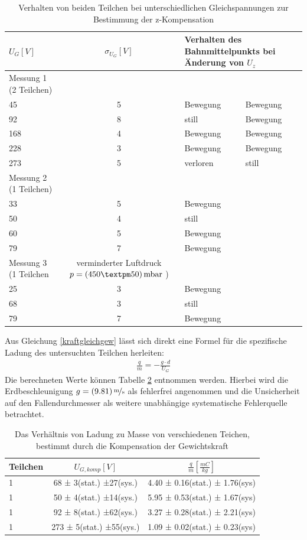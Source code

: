 \documentclass[a4paper,12pt]{article}
\begin{document}
\begin{table}
	\centering
	\begin{tabular}{ l | c | l | l }
		$U_{G} [V]$ & $\sigma_{U_{G}}[V]$ & \multicolumn{2}{l}{Verhalten des Bahnmittelpunkts bei Änderung von $U_z$}  \\
		\hline
		\hline
		Messung 1 (2 Teilchen)\\
		45 & 5 & Bewegung &  Bewegung   \\
		92 & 8 & still  & Bewegung \\
		168 & 4 & Bewegung & Bewegung    \\
		228 & 3 & Bewegung & Bewegung \\
		273 & 5 & verloren & still \\
		\hline
		Messung 2 (1 Teilchen)\\
		33 & 5 & Bewegung \\
		50 & 4 & still\\
		60 & 5 & Bewegung \\
		79 & 7 & Bewegung\\
		\hline
		Messung 3 (1 Teilchen & verminderter Luftdruck $p = \unit[(450±50)]{mbar}$ )\\
		25 & 3 & Bewegung\\
		68 & 3 & still\\
		79 & 7 & Bewegung\\
	\end{tabular}
\caption{Verhalten von beiden Teilchen bei unterschiedlichen Gleichspannungen zur Bestimmung der z-Kompensation}
\label{tab:z-komp-measure}
\end{table}

Aus Gleichung \ref{kraftgleichgew} lässt sich direkt eine Formel für die spezifische Ladung des untersuchten Teilchen herleiten:
\begin{align}\label{zspezm}
	\frac{q}{m} = -\frac{g \cdot  d}{U_{G}}
\end{align}
Die berechneten Werte können Tabelle \ref{tab:z-komp-result} entnommen werden. Hierbei wird die Erdbeschleunigung 
$g = \unitfrac[(9.81)]{m}{s}$ als fehlerfrei angenommen und die Unsicherheit auf den Fallendurchmesser als weitere
unabhängige systematische Fehlerquelle betrachtet.


\begin{table}
	\centering
	\begin{tabular}{ l | c | c }
		Teilchen &$U_{G,komp} [V]$ & $\frac{q}{m}[\frac{mC}{kg}]$  \\
		\hline
		1 &  68 ± 3(stat.) ±27(sys.) &  4.40 ± 0.16(stat.) ± 1.76(sys)  \\
		1 &  50 ± 4(stat.) ±14(sys.) &  5.95 ± 0.53(stat.) ± 1.67(sys)  \\
		1 &  92 ± 8(stat.) ±62(sys.) &  3.27 ± 0.28(stat.) ± 2.21(sys)  \\
		1 &  273 ± 5(stat.) ±55(sys.) & 1.09 ± 0.02(stat.) ± 0.23(sys)  \\
	\end{tabular}
\caption{Das Verhältnis von Ladung zu Masse von verschiedenen Teichen, bestimmt durch die Kompensation der Gewichtskraft}
\label{tab:z-komp-result}
\end{table}
\end{document}
